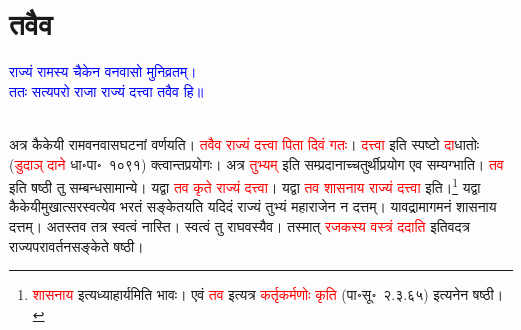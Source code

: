 \section[तवैव]{तवैव}
\centering\textcolor{blue}{राज्यं रामस्य चैकेन वनवासो मुनिव्रतम्।\nopagebreak\\
ततः सत्यपरो राजा राज्यं दत्त्वा तवैव हि॥}\nopagebreak\\
\\
\begin{sloppypar}\justifying\noindent\hspace{10mm} अत्र कैकेयी राम\-वन\-वास\-घटनां वर्णयति। \textcolor{red}{तवैव राज्यं दत्त्वा पिता दिवं गतः}। \textcolor{red}{दत्त्वा} इति स्पष्टो \textcolor{red}{दा}\-धातोः (\textcolor{red}{डुदाञ् दाने} धा॰पा॰~१०९१) क्त्वान्त\-प्रयोगः। अत्र \textcolor{red}{तुभ्यम्‌} इति सम्प्रदानाच्चतुर्थीप्रयोग एव सम्यग्भाति। \textcolor{red}{तव} इति षष्ठी तु सम्बन्ध\-सामान्ये। यद्वा \textcolor{red}{तव कृते राज्यं दत्त्वा}।
यद्वा \textcolor{red}{तव शासनाय राज्यं दत्त्वा} इति।\footnote{\textcolor{red}{शासनाय} इत्यध्याहार्यमिति भावः। एवं \textcolor{red}{तव} इत्यत्र \textcolor{red}{कर्तृकर्मणोः कृति} (पा॰सू॰~२.३.६५) इत्यनेन षष्ठी।} यद्वा कैकेयी\-मुखात्सरस्वत्येव भरतं सङ्केतयति यदिदं राज्यं तुभ्यं महाराजेन न दत्तम्। यावद्रामागमनं शासनाय दत्तम्। अतस्तव तत्र स्वत्वं नास्ति। स्वत्वं तु राघवस्यैव। तस्मात् \textcolor{red}{रजकस्य वस्त्रं ददाति} इतिवदत्र राज्य\-परावर्तन\-सङ्केते षष्ठी।\end{sloppypar}
